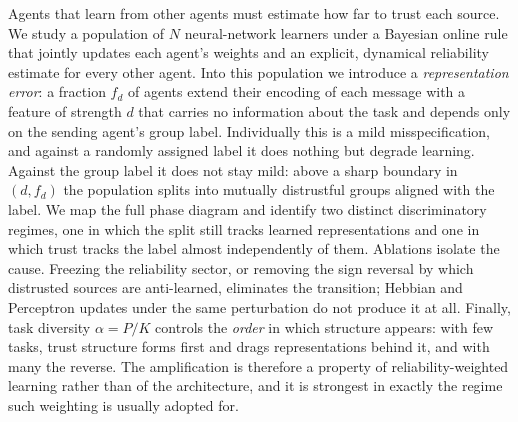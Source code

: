 Agents that learn from other agents must estimate how far to trust each source.
We study a population of $N$ neural-network learners under a Bayesian online rule
that jointly updates each agent's weights and an explicit, dynamical reliability
estimate for every other agent. Into this population we introduce a
\emph{representation error}: a fraction $f_d$ of agents extend their encoding of
each message with a feature of strength $d$ that carries no information about the
task and depends only on the sending agent's group label. Individually this is a
mild misspecification, and against a randomly assigned label it does nothing but
degrade learning. Against the group label it does not stay mild: above a sharp
boundary in $(d, f_d)$ the population splits into mutually distrustful groups
aligned with the label. We map the full phase diagram and identify two distinct
discriminatory regimes, one in which the split still tracks learned
representations and one in which trust tracks the label almost independently of
them. Ablations isolate the cause. Freezing the reliability sector, or removing
the sign reversal by which distrusted sources are anti-learned, eliminates the
transition; Hebbian and Perceptron updates under the same perturbation do not
produce it at all. Finally, task diversity $\alpha = P/K$ controls the
\emph{order} in which structure appears: with few tasks, trust structure forms
first and drags representations behind it, and with many the reverse. The
amplification is therefore a property of reliability-weighted learning rather than
of the architecture, and it is strongest in exactly the regime such weighting is
usually adopted for.
